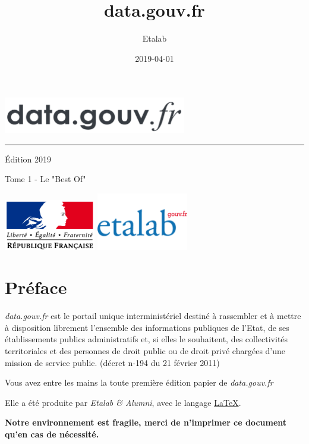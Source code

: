 \documentclass[a4paper, 11pt]{book}
\title{data.gouv.fr}
\author{Etalab}
\date{2019-04-01}
\begin{document}
{
\frontmatter
\begin{titlepage}
\thispagestyle{empty}
\vspace*{\fill}

\includegraphics[width=8cm]{images/datagouv.png}
\newline
\rule{\textwidth}{0.2pt}
\Large \par \hfill Édition 2019
\vspace*{\fill}
\newline
\begin{center} 
\LARGE Tome 1 - Le "Best Of"
\par
\end{center}

\vspace*{\fill}
\includegraphics[width=4cm]{images/marianne.png}
\hfill
\includegraphics[width=4cm]{images/logo-etalab.png}

\end{titlepage}
\pagebreak
\normalsize
{}
\section*{Préface}

\emph{data.gouv.fr} est le portail unique interministériel destiné à
rassembler et à mettre à disposition librement l'ensemble des
informations publiques de l'Etat, de ses établissements publics
administratifs et, si elles le souhaitent, des collectivités
territoriales et des personnes de droit public ou de droit privé
chargées d'une mission de service public.
(décret n-194 du 21 février 2011)

\noindent
Vous avez entre les mains la toute première édition papier de \emph{data.gouv.fr}
\par
\noindent
Elle a été produite par \emph{Etalab \& Alumni}, avec le langage \href{https://fr.wikipedia.org/wiki/LaTeX}{\LaTeX}.
\par
\noindent
\textbf{Notre environnement est fragile, merci de n’imprimer ce document qu’en cas de nécessité.}

}
\end{document}
